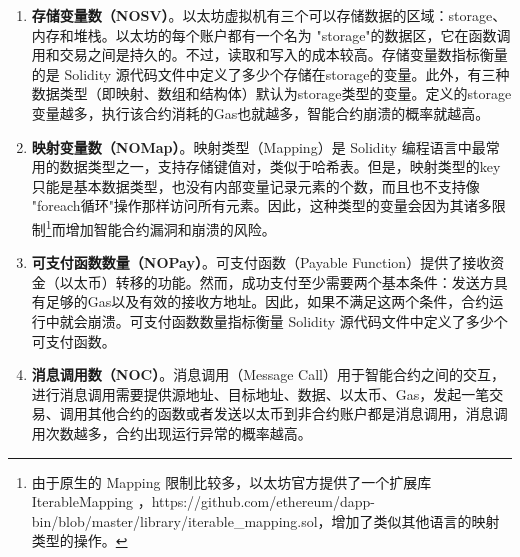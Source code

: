 \begin{enumerate}[label=\Alph*., align=left, leftmargin=*]
    \item \textbf{存储变量数（NOSV）}。以太坊虚拟机有三个可以存储数据的区域：storage、内存和堆栈。以太坊的每个账户都有一个名为 "storage"的数据区，它在函数调用和交易之间是持久的。不过，读取和写入的成本较高。存储变量数指标衡量的是 Solidity 源代码文件中定义了多少个存储在storage的变量。此外，有三种数据类型（即映射、数组和结构体）默认为storage类型的变量。定义的storage变量越多，执行该合约消耗的Gas也就越多，智能合约崩溃的概率就越高。
    \item \textbf{映射变量数（NOMap）}。映射类型（Mapping）是 Solidity 编程语言中最常用的数据类型之一，支持存储键值对，类似于哈希表。但是，映射类型的key只能是基本数据类型，也没有内部变量记录元素的个数，而且也不支持像 "foreach循环"操作那样访问所有元素。因此，这种类型的变量会因为其诸多限制\footnote{由于原生的 Mapping 限制比较多，以太坊官方提供了一个扩展库 IterableMapping ，https://github.com/ethereum/dapp-bin/blob/master/library/iterable\_mapping.sol，增加了类似其他语言的映射类型的操作。}而增加智能合约漏洞和崩溃的风险。
    \item \textbf{可支付函数数量（NOPay）}。可支付函数（Payable Function）提供了接收资金（以太币）转移的功能。然而，成功支付至少需要两个基本条件：发送方具有足够的Gas以及有效的接收方地址。因此，如果不满足这两个条件，合约运行中就会崩溃。可支付函数数量指标衡量 Solidity 源代码文件中定义了多少个可支付函数。
    \item \textbf{消息调用数（NOC）}。消息调用（Message Call）用于智能合约之间的交互，进行消息调用需要提供源地址、目标地址、数据、以太币、Gas，发起一笔交易、调用其他合约的函数或者发送以太币到非合约账户都是消息调用，消息调用次数越多，合约出现运行异常的概率越高。

\end{enumerate}
